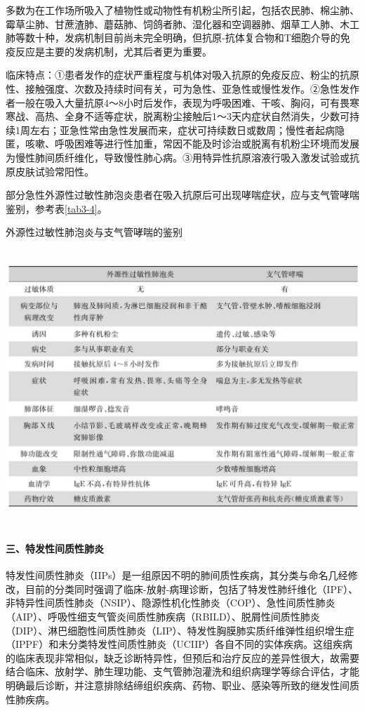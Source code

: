 多数为在工作场所吸入了植物性或动物性有机粉尘所引起，包括农民肺、棉尘肺、霉草尘肺、甘蔗渣肺、蘑菇肺、饲鸽者肺、湿化器和空调器肺、烟草工人肺、木工肺等数十种，发病机制目前尚未完全明确，但抗原-抗体复合物和T细胞介导的免疫反应是主要的发病机制，尤其后者更为重要。

临床特点：①患者发作的症状严重程度与机体对吸入抗原的免疫反应、粉尘的抗原性、接触强度、次数及持续时间有关，可为急性、亚急性或慢性发作。②急性发作者一般在吸入大量抗原4～8小时后发作，表现为呼吸困难、干咳、胸闷，可有畏寒寒战、高热、全身不适等症状，脱离粉尘接触后1～3天内症状自然消失，少数可持续1周左右；亚急性常由急性发展而来，症状可持续数日或数周；慢性者起病隐匿，咳嗽、呼吸困难等进行性加重，常因不能及时诊治或脱离有机粉尘环境而发展为慢性肺间质纤维化，导致慢性肺心病。③用特异性抗原溶液行吸入激发试验或抗原皮肤试验常阳性。

部分急性外源性过敏性肺泡炎患者在吸入抗原后可出现哮喘症状，应与支气管哮喘鉴别，参考表\ref{tab3-4}。

\begin{table}[htbp]
\centering
\caption{外源性过敏性肺泡炎与支气管哮喘的鉴别}
\label{tab3-4}
\includegraphics[width=5.90625in,height=4.09375in]{./images/Image00035.jpg}
\end{table}

\paragraph{三、特发性间质性肺炎}

特发性间质性肺炎（IIPs）是一组原因不明的肺间质性疾病，其分类与命名几经修改，目前的分类同时强调了临床-放射-病理诊断，包括了特发性肺纤维化（IPF）、非特异性间质性肺炎（NSIP）、隐源性机化性肺炎（COP）、急性间质性肺炎（AIP）、呼吸性细支气管炎间质性肺疾病（RBILD）、脱屑性间质性肺炎（DIP）、淋巴细胞性间质性肺炎（LIP）、特发性胸膜肺实质纤维弹性组织增生症（IPPF）和未分类特发性间质性肺炎（UCIIP）各自不同的实体疾病。这组疾病的临床表现非常相似，缺乏诊断特异性，但预后和治疗反应的差异性很大，故需要结合临床、放射学、肺生理功能、支气管肺泡灌洗和组织病理学等综合评估，才能明确最后诊断，并注意排除结缔组织疾病、药物、职业、感染等所致的继发性间质性肺疾病。

